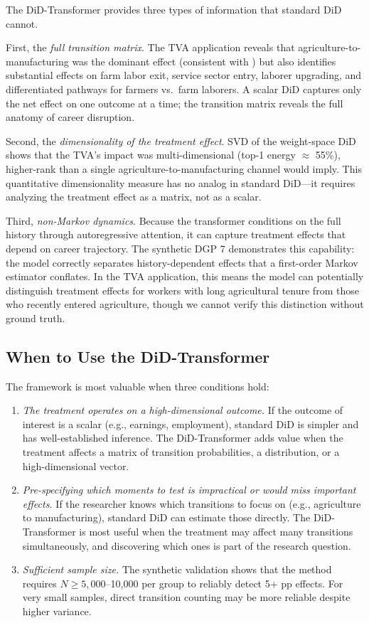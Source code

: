 \documentclass[12pt]{article}
\begin{document}
The DiD-Transformer provides three types of information that standard DiD cannot.

First, the \textit{full transition matrix}. The TVA application reveals that agriculture-to-manufacturing was the dominant effect (consistent with \citealt{klineMoretti2014local}) but also identifies substantial effects on farm labor exit, service sector entry, laborer upgrading, and differentiated pathways for farmers vs.\ farm laborers. A scalar DiD captures only the net effect on one outcome at a time; the transition matrix reveals the full anatomy of career disruption.

Second, the \textit{dimensionality of the treatment effect}. SVD of the weight-space DiD shows that the TVA's impact was multi-dimensional (top-1 energy $\approx$ 55\%), higher-rank than a single agriculture-to-manufacturing channel would imply. This quantitative dimensionality measure has no analog in standard DiD---it requires analyzing the treatment effect as a matrix, not as a scalar.

Third, \textit{non-Markov dynamics}. Because the transformer conditions on the full history through autoregressive attention, it can capture treatment effects that depend on career trajectory. The synthetic DGP 7 demonstrates this capability: the model correctly separates history-dependent effects that a first-order Markov estimator conflates. In the TVA application, this means the model can potentially distinguish treatment effects for workers with long agricultural tenure from those who recently entered agriculture, though we cannot verify this distinction without ground truth.

\subsection{When to Use the DiD-Transformer}

The framework is most valuable when three conditions hold:

\begin{enumerate}
\item \textit{The treatment operates on a high-dimensional outcome.} If the outcome of interest is a scalar (e.g., earnings, employment), standard DiD is simpler and has well-established inference. The DiD-Transformer adds value when the treatment affects a matrix of transition probabilities, a distribution, or a high-dimensional vector.

\item \textit{Pre-specifying which moments to test is impractical or would miss important effects.} If the researcher knows which transitions to focus on (e.g., agriculture to manufacturing), standard DiD can estimate those directly. The DiD-Transformer is most useful when the treatment may affect many transitions simultaneously, and discovering which ones is part of the research question.

\item \textit{Sufficient sample size.} The synthetic validation shows that the method requires $N \geq 5,000$--10,000 per group to reliably detect 5+ pp effects. For very small samples, direct transition counting may be more reliable despite higher variance.
\end{enumerate}
\end{document}
